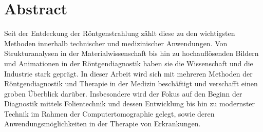 \section{Abstract}

Seit der Entdeckung der Röntgenstrahlung zählt diese zu den wichtigsten Methoden innerhalb technischer und medizinischer Anwendungen.
Von Strukturanalysen in der Materialwissenschaft bis hin zu hochauflösenden Bildern und Animationen in der Röntgendiagnostik haben 
sie die Wissenschaft und die Industrie stark geprägt. In dieser Arbeit wird sich mit mehreren Methoden der Röntgendiagnostik und 
Therapie in der Medizin beschäftigt und verschafft einen groben Überblick darüber. Insbesondere wird der Fokus auf den Beginn der 
Diagnostik mittels Folientechnik und dessen Entwicklung bis hin zu modernster Technik im Rahmen der Computertomographie gelegt, sowie
deren Anwendungsmöglichkeiten in der Therapie von Erkrankungen.

